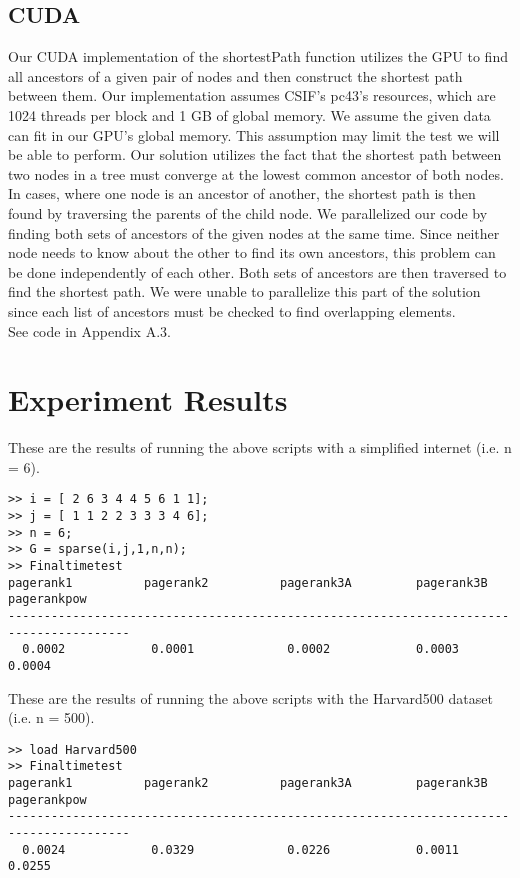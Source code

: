 \documentclass[11pt,letterpaper]{article}
\begin{document}
\subsection{CUDA}
Our CUDA implementation of the shortestPath function utilizes the GPU to find all ancestors of a given pair of nodes and then construct the shortest path between them. 
Our implementation assumes CSIF's pc43's resources, which are 1024 threads per block and 1 GB of global memory. We assume the given data can fit in our GPU’s global memory. 
This assumption may limit the test we will be able to perform. 
Our solution utilizes the fact that the shortest path between two nodes in a tree must converge at the lowest common ancestor of both nodes. 
In cases, where one node is an ancestor of another, the shortest path is then found by traversing the parents of the child node. 
We parallelized our code by finding both sets of ancestors of the given nodes at the same time. 
Since neither node needs to know about the other to find its own ancestors, this problem can be done independently of each other. 
Both sets of ancestors are then traversed to find the shortest path. 
We were unable to parallelize this part of the solution since each list of ancestors must be checked to find overlapping elements. \\

See code in Appendix A.3.\\

\section{Experiment Results}

These are the results of running the above scripts with a simplified internet (i.e.  n = 6).
\begin{verbatim}
>> i = [ 2 6 3 4 4 5 6 1 1];
>> j = [ 1 1 2 2 3 3 3 4 6];
>> n = 6;
>> G = sparse(i,j,1,n,n);
>> Finaltimetest
pagerank1          pagerank2          pagerank3A         pagerank3B        pagerankpow
---------------------------------------------------------------------------------------
  0.0002            0.0001             0.0002            0.0003            0.0004
\end{verbatim}
These are the results of running the above scripts with the Harvard500 dataset (i.e. n = 500).
\begin{verbatim}
>> load Harvard500
>> Finaltimetest
pagerank1          pagerank2          pagerank3A         pagerank3B        pagerankpow
---------------------------------------------------------------------------------------
  0.0024            0.0329             0.0226            0.0011            0.0255
\end{verbatim}
\end{document}
